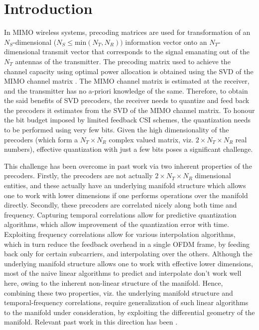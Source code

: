 \documentclass[conference]{IEEEtran}
\begin{document}
\section{Introduction}
\label{intro}
In MIMO wireless systems, precoding matrices are used for transformation of an $N_S$-dimensional ($N_S \leq \text{min}(N_T,N_R))$ information vector onto an $N_T$-dimensional transmit vector that corresponds to the signal emanating out of the $N_T$ antennas of the transmitter.
The precoding matrix used to achieve the channel capacity using optimal power allocation is obtained using the SVD of the MIMO channel matrix \cite{love2008overview}.
The MIMO channel matrix is estimated at the receiver, and the transmitter has no a-priori knowledge of the same.
Therefore, to obtain the said benefits of SVD precoders, the receiver needs to quantize and feed back the precoders it estimates from the SVD of the MIMO channel matrix.
To honour the bit budget imposed by limited feedback CSI schemes, the quantization needs to be performed using very few bits.
Given the high dimensionality of the precoders (which form a $N_T \times N_R$ complex valued matrix, viz. $2\times N_T\times N_R$ real numbers), effective quantization with just a few bits poses a significant challenge.

This challenge has been overcome in past work via two inherent properties of the precoders. 
Firstly, the precoders are not actually $2\times N_T\times N_R$ dimensional entities, and these actually have an underlying manifold structure which allows one to work with lower dimensions if one performs operations over the manifold directly.
Secondly, these precoders are correlated nicely along both time and frequency. 
Capturing temporal correlations allow for predictive quantization algorithms, which allow improvement of the quantization error with time.
Exploiting frequency correlations allow for various interpolation algorithms, which in turn reduce the feedback overhead in a single OFDM frame, by feeding back only for certain subcarriers, and interpolating over the others.
Although the underlying manifold structure allows one to work with effective lower dimensions, most of the naive linear algorithms to predict and interpolate don't work well here, owing to the inherent non-linear structure of the manifold.
Hence, combining these two properties, viz. the underlying manifold structure and temporal-frequency correlations, require generalization of such linear algorithms to the manifold under consideration, by exploiting the differential geometry of the manifold. Relevant past work in this direction has been \cite{Gupt1905:Predictive,6891198,6545375,5671092,Li2016,khaled2005quantized,krishnamachari2013geometry}.
\end{document}
